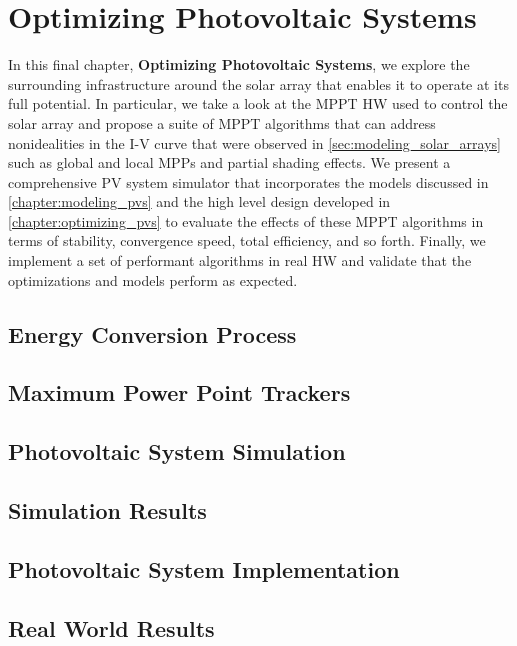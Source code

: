 \chapter{Optimizing Photovoltaic Systems}\label{chapter:optimizing_pv_systems}

In this final chapter, \textbf{Optimizing Photovoltaic Systems}, we explore the
surrounding infrastructure around the solar array that enables it to operate at
its full potential. In particular, we take a look at the \acf{MPPT} \acf{HW}
used to control the solar array and propose a suite of MPPT algorithms that can
address nonidealities in the \ac{I-V} curve that were observed in
\autoref{sec:modeling_solar_arrays} such as global and local \acfp{MPP} and partial
shading effects. We present a comprehensive \ac{PV} system simulator that
incorporates the models discussed in \autoref{chapter:modeling_pvs} and the
high level design developed in \autoref{chapter:optimizing_pvs} to evaluate the
effects of these \ac{MPPT} algorithms in terms of stability, convergence speed,
total efficiency, and so forth. Finally, we implement a set of performant
algorithms in real \ac{HW} and validate that the optimizations and models
perform as expected.

\section{Energy Conversion Process}\label{sec:energy_conversion_process}
\section{Maximum Power Point Trackers}\label{sec:maximum_power_point_trackers}
\section{Photovoltaic System Simulation}\label{sec:pv_sys_sim}
\section{Simulation Results}\label{sec:sim_results}
\section{Photovoltaic System Implementation}\label{sec:pv_sys_impl}
\section{Real World Results}\label{sec:real_results}
\newpage

